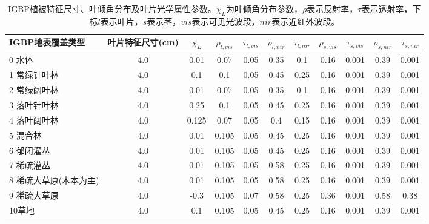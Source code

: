 \begin{landscape}
\begin{table}[htbp]    
    \centering
    \caption{IGBP植被特征尺寸、叶倾角分布及叶片光学属性参数。$\chi_L$为叶倾角分布参数，$\rho$表示反射率，$\tau$表示透射率，下标$l$表示叶片，$s$表示茎，$vis$表示可见光波段，$nir$表示近红外波段。}
    \label{tab:IGBP植被特征尺寸叶倾角分布及叶片光学属性参数1}
        \begin{tabular}{@{}lcccccccccc@{}}
        \toprule
        IGBP地表覆盖类型     & 叶片特征尺寸(cm) & $\chi_L$ &$\rho_{l, vis}$ & $\tau_{l, vis}$  &$\rho_{l, nir}$ &$\tau_{l, nir}$ & $\rho_{s, vis}$ &$\tau_{s, vis}$ &$\rho_{s, nir}$ &$\tau_{s, nir}$\\ \midrule
        0 水体          & 4.0        & 0.01  & 0.07  & 0.05 & 0.35 & 0.1  & 0.16 & 0.001 & 0.39 & 0.001 \\
        1 常绿针叶林       & 4.0        & 0.1   & 0.1   & 0.05 & 0.45 & 0.25 & 0.16 & 0.001 & 0.39 & 0.001 \\
        2 常绿阔叶林       & 4.0        & 0.01  & 0.07  & 0.05 & 0.35 & 0.1  & 0.16 & 0.001 & 0.39 & 0.001 \\
        3 落叶针叶林       & 4.0        & 0.25  & 0.1   & 0.05 & 0.45 & 0.25 & 0.16 & 0.001 & 0.39 & 0.001 \\
        4 落叶阔叶林       & 4.0        & 0.125 & 0.07  & 0.05 & 0.4  & 0.15 & 0.16 & 0.001 & 0.39 & 0.001 \\
        5 混合林         & 4.0        & 0.01  & 0.105 & 0.05 & 0.45 & 0.25 & 0.16 & 0.001 & 0.39 & 0.001 \\
        6 郁闭灌丛        & 4.0        & 0.01  & 0.105 & 0.05 & 0.45 & 0.25 & 0.16 & 0.001 & 0.39 & 0.001 \\
        7 稀疏灌丛        & 4.0        & 0.01  & 0.105 & 0.05 & 0.58 & 0.25 & 0.16 & 0.001 & 0.39 & 0.001 \\
        8 稀疏大草原(木本为主) & 4.0        & 0.01  & 0.105 & 0.05 & 0.58 & 0.25 & 0.16 & 0.001 & 0.39 & 0.001 \\
        9 稀疏大草原       & 4.0        & -0.3  & 0.105 & 0.07 & 0.58 & 0.25 & 0.36 & 0.001 & 0.58 & 0.38  \\
        10草地          & 4.0        & 0.1   & 0.105 & 0.05 & 0.45 & 0.25 & 0.16 & 0.001 & 0.39 & 0.001 \\ %

\end{tabular}
\end{table}
\end{landscape}
